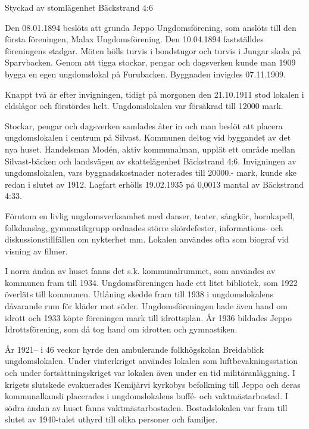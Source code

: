 %

Styckad av stomlägenhet Bäckstrand 4:6


%

Den 08.01.1894 beslöts att grunda Jeppo Ungdomsförening, som anslöts till den första föreningen, Malax Ungdomsförening. Den 10.04.1894 fastställdes föreningens stadgar. Möten hölls turvis i bondstugor och turvis i Jungar skola på Sparvbacken. Genom att tigga stockar, pengar och dagsverken kunde man 1909 bygga en egen ungdomslokal på Furubacken. Byggnaden invigdes 07.11.1909.


Knappt två år efter invigningen, tidigt på morgonen den 21.10.1911 stod lokalen i eldslågor och förstördes helt. Ungdomslokalen var försäkrad till 12000 mark.

Stockar, pengar och dagsverken samlades åter in och man beslöt att placera ungdomslokalen i centrum på Silvast. Kommunen deltog vid byggandet av det nya huset. Handelsman Modén, aktiv kommunalman, upplät ett område mellan Silvast-bäcken och landsvägen av skattelägenhet Bäckstrand 4:6. Invigningen av ungdomslokalen, vars byggnadskostnader noterades till 20000.- mark, kunde ske redan i slutet av 1912. Lagfart erhölls 19.02.1935 på 0,0013 mantal av Bäckstrand 4:33.

Förutom en livlig ungdomsverksamhet med danser, teater, sångkör, hornkapell, folkdanslag, gymnastikgrupp ordnades större skördefester, informations- och diskussionstillfällen om nykterhet mm. Lokalen användes ofta som biograf vid visning av filmer.

I norra ändan av huset fanns det s.k. kommunalrummet, som användes av kommunen fram till 1934. Ungdomsföreningen hade ett litet bibliotek, som 1922 överläts till kommunen. Utlåning skedde fram till 1938 i ungdomslokalens dåvarande rum för kläder mot söder. Ungdomsföreningen hade även hand om idrott och 1933 köpte föreningen mark till idrottsplan. År 1936 bildades Jeppo Idrottsförening, som då tog hand om idrotten och gymnastiken.

År 1921-- i 46 veckor hyrde den ambulerande folkhögskolan Breidablick ungdomslokalen. Under vinterkriget användes lokalen som luftbevakningsstation och under fortsättningskriget var lokalen även under en tid militäranläggning. I krigets slutskede evakuerades Kemijärvi kyrkobys befolkning till Jeppo och deras kommunalkansli placerades i ungdomslokalens buffé- och vaktmästarbostad. I södra ändan av huset fanns vaktmästarbostaden. Bostadslokalen var fram till slutet av 1940-talet uthyrd till olika personer och familjer.


